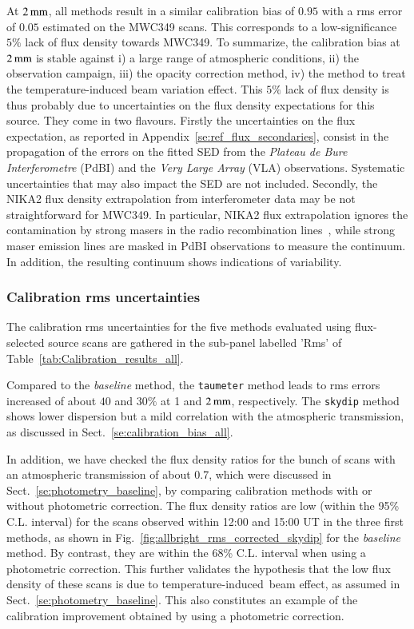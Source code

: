 \documentclass[traditionalabstract]{aa}
\newcommand{\afternoon}{temperature-induced}
\newcommand{\lp}[1]{#1}
\begin{document}
At $2\,\rm{mm}$, all methods result in a similar calibration bias
of $0.95$ with a rms error of $0.05$ estimated on the MWC349 scans. 
This corresponds to a low-significance $5\%$ lack of flux density
towards MWC349.
To summarize, the calibration bias at $2\, \rm{mm}$ is stable against
i) a large range of atmospheric conditions, ii) the observation campaign, iii) the
opacity correction method, iv) the method to treat the
temperature-induced beam variation effect.
This $5\%$ lack of flux density is thus probably due to
uncertainties on the flux density expectations for this source.
They come in two flavours.
{\lp Firstly the uncertainties on the flux expectation, as reported in
Appendix~\ref{se:ref_flux_secondaries}, consist in the propagation of
the errors on the fitted SED from the \emph{Plateau de Bure Interferometre}
(PdBI) and the \emph{Very Large Array} (VLA) observations. Systematic
uncertainties that may also impact the SED are not included.}  
Secondly, the NIKA2 flux density extrapolation from
interferometer data may be not straightforward for MWC349. {\lp In
particular, NIKA2 flux extrapolation ignores the contamination by
strong masers in the radio recombination lines~\citep{masingRRL},
while strong maser emission lines are masked in PdBI observations to
measure the continuum. In addition, the resulting continuum shows
indications of variability.}


\subsubsection{Calibration rms uncertainties}

The calibration rms uncertainties for the five methods evaluated using
flux-selected source scans are gathered in the sub-panel labelled 'Rms'
of Table~\ref{tab:Calibration_results_all}.

Compared to the \emph{baseline} method, the {\tt taumeter} method leads to 
rms errors increased of about $40$ and $30\%$ at 1 and
$2\,\rm{mm}$, respectively. The {\tt skydip} method shows lower
dispersion but a mild correlation with the atmospheric transmission, as
discussed in Sect.~\ref{se:calibration_bias_all}.

In addition, we have checked the flux density ratios for the bunch of
scans with an atmospheric transmission of about 0.7, which were
discussed in Sect.~\ref{se:photometry_baseline}, by comparing
calibration methods with or without photometric correction. The
flux density ratios are low (within the 95\% C.L. interval) for the scans
observed within 12:00 and 15:00 UT in the three first methods, as shown in
Fig.~\ref{fig:allbright_rms_corrected_skydip} for
the \emph{baseline} method. By contrast, they are within the 68\% C.L. interval
when using a photometric correction. This further validates the
hypothesis that the low flux
density of these scans is due to \afternoon\ beam effect, as assumed in
Sect.~\ref{se:photometry_baseline}. This also constitutes an example
of the calibration improvement obtained by using a
photometric correction.
\end{document}
